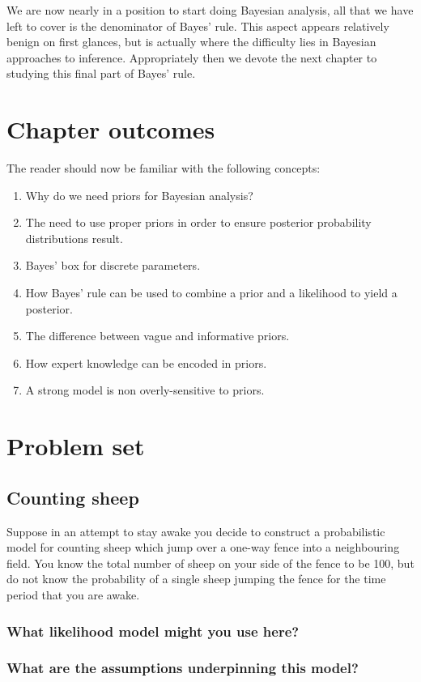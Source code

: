 \documentclass[11pt,fullpage]{book}
\begin{document}
We are now nearly in a position to start doing Bayesian analysis, all that we have left to cover is the denominator of Bayes' rule. This aspect appears relatively benign on first glances, but is actually where the difficulty lies in Bayesian approaches to inference. Appropriately then we devote the next chapter to studying this final part of Bayes' rule.

\section{Chapter outcomes}
The reader should now be familiar with the following concepts:
\begin{enumerate}
\item Why do we need priors for Bayesian analysis?
\item The need to use proper priors in order to ensure posterior probability distributions result.
\item Bayes' box for discrete parameters.
\item How Bayes' rule can be used to combine a prior and a likelihood to yield a posterior.
\item The difference between vague and informative priors.
\item How expert knowledge can be encoded in priors.
\item A strong model is non overly-sensitive to priors.
\end{enumerate}

\section{Problem set}
\subsection{Counting sheep}
Suppose in an attempt to stay awake you decide to construct a probabilistic model for counting sheep which jump over a one-way fence into a neighbouring field. You know the total number of sheep on your side of the fence to be 100, but do not know the probability of a single sheep jumping the fence for the time period that you are awake.

\subsubsection{What likelihood model might you use here?}
\subsubsection{What are the assumptions underpinning this model?}
\end{document}
